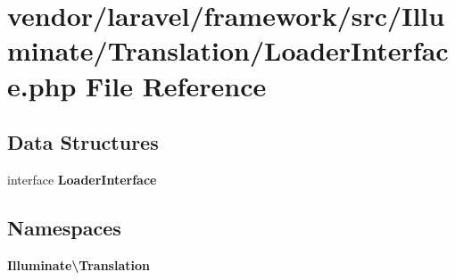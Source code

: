 \section{vendor/laravel/framework/src/\+Illuminate/\+Translation/\+Loader\+Interface.php File Reference}
\label{laravel_2framework_2src_2_illuminate_2_translation_2_loader_interface_8php}
\subsection*{Data Structures}
\begin{DoxyCompactItemize}
\item 
interface {\bf Loader\+Interface}
\end{DoxyCompactItemize}
\subsection*{Namespaces}
\begin{DoxyCompactItemize}
\item 
 {\bf Illuminate\textbackslash{}\+Translation}
\end{DoxyCompactItemize}
